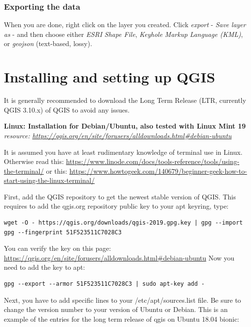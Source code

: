 \documentclass[12pt,a4paper]{scrartcl}
\begin{document}
\subsubsection{Exporting the data}
When you are done, right click on the layer you created. Click  \textit{export} - \textit{Save layer as} - and then choose either \textit{ESRI Shape File}, \textit{Keyhole Markup Language (KML)}, or \textit{geojson} (text-based, lossy).


\section{Installing and setting up QGIS}
\label{sec:qgis_install}
It is generally recommended to download the Long Term Release (LTR, currently QGIS 3.10.x) of QGIS to avoid any issues. \newline

\textbf{Linux: Installation for Debian/Ubuntu, also tested with Linux Mint 19} \newline
\textit{resource: \url{https://qgis.org/en/site/forusers/alldownloads.html\#debian-ubuntu}} \newline 

It is assumed you have at least rudimentary knowledge of terminal use in Linux. \newline
Otherwise read this: 
\url{https://www.linode.com/docs/tools-reference/tools/using-the-terminal/} \newline
or this: 
\url{https://www.howtogeek.com/140679/beginner-geek-how-to-start-using-the-linux-terminal/} \newline

First, add the QGIS repository to get the newest stable version of QGIS.
This requires to add the qgis.org repository public key to your apt keyring, type:

\begin{verbatim}
wget -O - https://qgis.org/downloads/qgis-2019.gpg.key | gpg --import
gpg --fingerprint 51F523511C7028C3
\end{verbatim}

You can verify the key on this page: \url{https://qgis.org/en/site/forusers/alldownloads.html\#debian-ubuntu}
Now you need to add the key to apt:  

\begin{verbatim}
gpg --export --armor 51F523511C7028C3 | sudo apt-key add -
\end{verbatim}

Next, you have to add specific lines to your /etc/apt/sources.list file.
Be sure to change the version number to your version of Ubuntu or Debian. \newline
This is an example of the entries for the long term release of qgis on Ubuntu 18.04 bionic:
\end{document}

